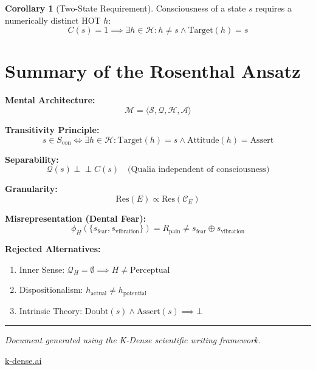 \documentclass[11pt,a4paper]{article}
\theoremstyle{definition}
\newtheorem{corollary}{Corollary}[section]
\theoremstyle{remark}
\newcommand{\M}{\mathcal{M}}
\newcommand{\Sset}{\mathcal{S}}
\newcommand{\Q}{\mathcal{Q}}
\newcommand{\Hset}{\mathcal{H}}
\newcommand{\A}{\mathcal{A}}
\newcommand{\Scon}{S_{\text{con}}}
\newcommand{\ConceptE}{\mathcal{C}_E}
\newcommand{\Res}{\text{Res}}
\newcommand{\Target}{\text{Target}}
\newcommand{\Attitude}{\text{Attitude}}
\begin{document}
\begin{corollary}[Two-State Requirement]
\label{cor:two-state}
Consciousness of a state $s$ requires a numerically distinct HOT $h$:
\begin{equation}
\boxed{C(s) = 1 \implies \exists h \in \Hset : h \neq s \land \Target(h) = s}
\end{equation}
\end{corollary}

\section{Summary of the Rosenthal Ansatz}

\begin{tcolorbox}[colback=green!5!white, colframe=green!75!black, title=\textbf{The Rosenthal Ansatz: Complete Formalization}]

\textbf{Mental Architecture:}
\begin{equation}
\M = \langle \Sset, \Q, \Hset, \A \rangle
\end{equation}

\textbf{Transitivity Principle:}
\begin{equation}
s \in \Scon \iff \exists h \in \Hset : \Target(h) = s \land \Attitude(h) = \text{Assert}
\end{equation}

\textbf{Separability:}
\begin{equation}
\Q(s) \perp\!\!\!\perp C(s) \quad \text{(Qualia independent of consciousness)}
\end{equation}

\textbf{Granularity:}
\begin{equation}
\Res(E) \propto \Res(\ConceptE)
\end{equation}

\textbf{Misrepresentation (Dental Fear):}
\begin{equation}
\phi_H(\{s_{\text{fear}}, s_{\text{vibration}}\}) = R_{\text{pain}} \neq s_{\text{fear}} \oplus s_{\text{vibration}}
\end{equation}

\textbf{Rejected Alternatives:}
\begin{enumerate}
    \item Inner Sense: $\Q_H = \emptyset \implies H \neq \text{Perceptual}$
    \item Dispositionalism: $h_{\text{actual}} \neq h_{\text{potential}}$
    \item Intrinsic Theory: $\text{Doubt}(s) \land \text{Assert}(s) \implies \bot$
\end{enumerate}

\end{tcolorbox}

\vspace{2em}

\begin{center}
\rule{0.5\textwidth}{0.4pt}

\small\textit{Document generated using the K-Dense scientific writing framework.}

\href{https://k-dense.ai}{k-dense.ai}
\end{center}
\end{document}
